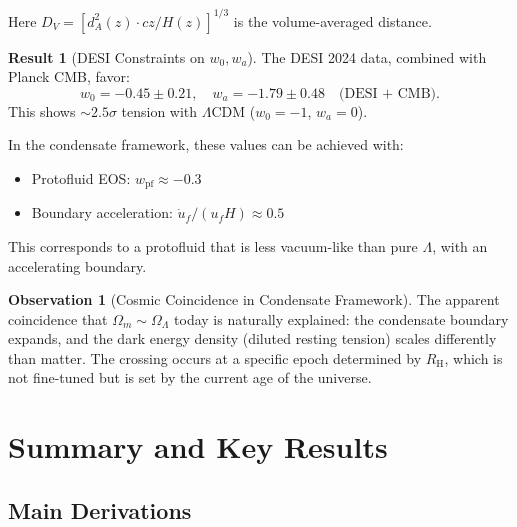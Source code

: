 \documentclass[11pt,a4paper]{article}
\newcommand{\RH}{\ensuremath{R_{\mathrm{H}}}}
\newcommand{\wpf}{\ensuremath{w_{\mathrm{pf}}}}
\newcommand{\OmegaLam}{\ensuremath{\Omega_\Lambda}}
\newcommand{\OmegaM}{\ensuremath{\Omega_m}}
\theoremstyle{definition}
\newtheorem{result}{Result}
\newtheorem{observation}{Observation}
\theoremstyle{remark}
\begin{document}
Here $D_V = [d_A^2(z) \cdot cz/H(z)]^{1/3}$ is the volume-averaged distance.

\begin{result}[DESI Constraints on $w_0, w_a$]
\label{result:DESI}
The DESI 2024 data, combined with Planck CMB, favor:
\begin{equation}
\boxed{w_0 = -0.45 \pm 0.21, \quad w_a = -1.79 \pm 0.48 \quad \text{(DESI + CMB)}.}
\end{equation}
This shows $\sim 2.5\sigma$ tension with $\Lambda$CDM ($w_0 = -1$, $w_a = 0$).

In the condensate framework, these values can be achieved with:
\begin{itemize}[leftmargin=*, itemsep=0.2em]
\item Protofluid EOS: $\wpf \approx -0.3$
\item Boundary acceleration: $\dot{u}_f/(u_f H) \approx 0.5$
\end{itemize}
This corresponds to a protofluid that is less vacuum-like than pure $\Lambda$, with an accelerating boundary.
\end{result}

\begin{observation}[Cosmic Coincidence in Condensate Framework]
\label{obs:coincidence}
The apparent coincidence that $\OmegaM \sim \OmegaLam$ today is naturally explained: the condensate boundary expands, and the dark energy density (diluted resting tension) scales differently than matter. The crossing occurs at a specific epoch determined by $\RH$, which is not fine-tuned but is set by the current age of the universe.
\end{observation}

\section{Summary and Key Results}
\label{sec:summary}

\subsection{Main Derivations}
\end{document}
